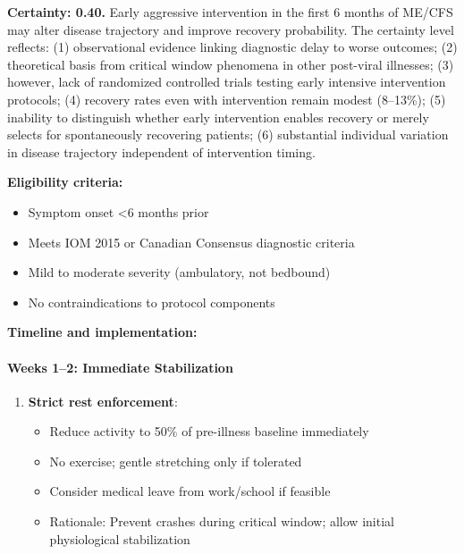 \begin{protocol}
\label{prot:acute-onset-intensive}

\textbf{Certainty: 0.40.} Early aggressive intervention in the first 6 months of ME/CFS may alter disease trajectory and improve recovery probability. The certainty level reflects: (1) observational evidence linking diagnostic delay to worse outcomes; (2) theoretical basis from critical window phenomena in other post-viral illnesses; (3) however, lack of randomized controlled trials testing early intensive intervention protocols; (4) recovery rates even with intervention remain modest (8--13\%); (5) inability to distinguish whether early intervention enables recovery or merely selects for spontaneously recovering patients; (6) substantial individual variation in disease trajectory independent of intervention timing.

\textbf{Eligibility criteria:}
\begin{itemize}
    \item Symptom onset <6 months prior
    \item Meets IOM 2015 or Canadian Consensus diagnostic criteria
    \item Mild to moderate severity (ambulatory, not bedbound)
    \item No contraindications to protocol components
\end{itemize}

\textbf{Timeline and implementation:}

\paragraph{Weeks 1--2: Immediate Stabilization}

\begin{enumerate}
    \item \textbf{Strict rest enforcement}:
    \begin{itemize}
        \item Reduce activity to 50\% of pre-illness baseline immediately
        \item No exercise; gentle stretching only if tolerated
        \item Consider medical leave from work/school if feasible
        \item Rationale: Prevent crashes during critical window; allow initial physiological stabilization
    \end{itemize}


\end{enumerate}
\end{protocol}
